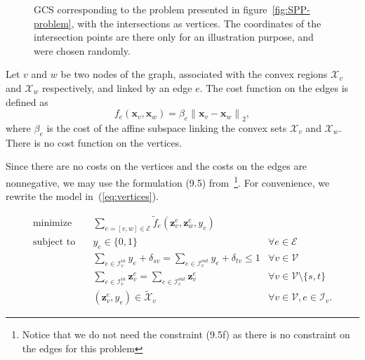 \documentclass[a4paper, 12pt]{article}
\begin{document}
\begin{figure}[!htb]
    \centering
    \caption{GCS corresponding to the problem presented in figure~\ref{fig:SPP-problem}, with the intersections as vertices. The coordinates of the intersection points are there only for an illustration purpose, and were chosen randomly.}\label{fig:vertices}
\end{figure}

Let $v$ and $w$ be two nodes of the graph, associated with the convex regions $\mathcal{X}_v$ and $\mathcal{X}_w$ respectively, and linked by an edge $e$. The cost function on the edges is defined as
\begin{equation}\label{eq:f_e}
    f_e(\mathbf{x}_v, \mathbf{x}_w) = \beta_e {\lVert \mathbf{x}_v - \mathbf{x}_w \rVert}_2,
\end{equation}
where $\beta_e$ is the cost of the affine subspace linking the convex sets $\mathcal{X}_v$ and $\mathcal{X}_w$. There is no cost function on the vertices.

Since there are no costs on the vertices and the costs on the edges are nonnegative, we may use the formulation (9.5) from~\cite{Tobia}\footnote{Notice that we do not need the constraint (9.5f) as there is no constraint on the edges for this problem}. For convenience, we rewrite the model in~(\ref{eq:vertices}).

\begin{subequations}\label{eq:vertices}
    \begin{align}
    \text{minimize}\quad   & \sum_{e = [v,w] \in \mathcal{E}} \tilde{f}_e (\mathbf{z}_v^e, \mathbf{z}_w^e, y_e)\label{eq:vertices-a}\\
    \text{subject to}\quad & y_e \in \{0, 1\} & \forall e \in \mathcal{E}\label{eq:vertices-b}\\
                           & \sum_{e \in \mathcal{I}_v^{in}} y_e + \delta_{sv} = \sum_{e \in \mathcal{I}_v^{out}} y_e + \delta_{tv} \leq 1 & \forall v \in \mathcal{V}\label{eq:vertices-c}\\
                           & \sum_{e \in \mathcal{I}_v^{in}} \mathbf{z}_v^e = \sum_{e \in \mathcal{I}_v^{out}} \mathbf{z}_v^e & \forall v \in \mathcal{V} \setminus \{s, t\}\label{eq:vertices-d}\\
                           & (\mathbf{z}_v^e, y_e) \in \tilde{\mathcal{X}}_v & \forall v \in \mathcal{V}, e \in \mathcal{I}_v.\label{eq:vertices-e}
    \end{align}
\end{subequations}
\end{document}
